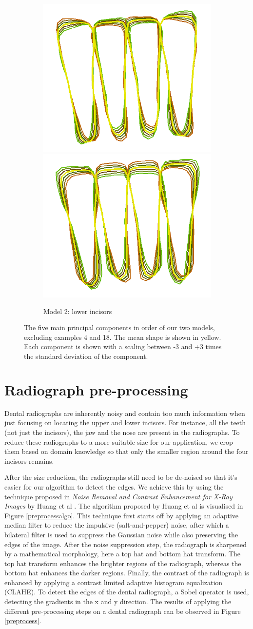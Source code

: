 \documentclass[a4paper,titlepage,12pt]{article}
\begin{document}
\begin{figure}
\begin{subfigure}{\linewidth}
		\includegraphics[width=0.19\linewidth]{shape/low_pca4}
		\includegraphics[width=0.19\linewidth]{shape/low_pca5}
		\caption{Model 2: lower incisors}
	\end{subfigure}
	\caption{The five main principal components in order of our two models, excluding examples 4 and 18. The mean shape is shown in yellow. Each component is shown with a scaling between -3 and +3 times the standard deviation of the component. }
	\label{fig:stdvar}
\end{figure}

\section{Radiograph pre-processing}
\label{sec:preproc}

Dental radiographs are inherently noisy and contain too much information when just focusing on locating the upper and lower incisors.
For instance, all the teeth (not just the incisors), the jaw and the nose are present in the radiographs.
To reduce these radiographs to a more suitable size for our application, we crop them based on domain knowledge so that only the smaller region around the four incisors remains.

After the size reduction, the radiographs still need to be de-noised so that it's easier for our algorithm to detect the edges.
We achieve this by using the technique proposed in \textit{Noise Removal and Contrast Enhancement for X-Ray Images} by Huang et al \cite{JBEMI1893}.
The algorithm proposed by Huang et al is visualised in Figure \ref{preprocessalgo}. This technique first starts off by applying an adaptive median filter to reduce the impulsive (salt-and-pepper) noise, after which a bilateral filter is used to suppress the Gaussian noise while also preserving the edges of the image.
After the noise suppression step, the radiograph is sharpened by a mathematical morphology, here a top hat and bottom hat transform.
The top hat transform enhances the brighter regions of the radiograph, whereas the bottom hat enhances the darker regions.
Finally, the contrast of the radiograph is enhanced by applying a contrast limited adaptive histogram equalization (CLAHE).
To detect the edges of the dental radiograph, a Sobel operator is used, detecting the gradients in the x and y direction.
The results of applying the different pre-processing steps on a dental radiograph can be observed in Figure \ref{preprocess}. 
\end{document}
